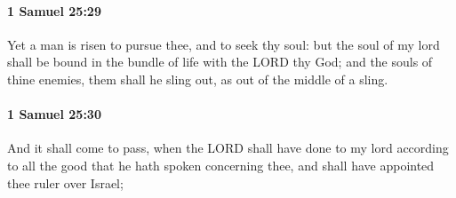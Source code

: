 		\paragraph{1 Samuel 25:29} %
			\label{1SAMUEL-25-29}

			Yet a man is risen to pursue thee, and to seek thy soul: but the soul of my lord shall be bound in the bundle of life with the LORD thy God; and the souls of thine enemies, them shall he sling out, as out of the middle of a sling.


		\paragraph{1 Samuel 25:30} %
			\label{1SAMUEL-25-30}

			And it shall come to pass, when the LORD shall have done to my lord according to all the good that he hath spoken concerning thee, and shall have appointed thee ruler over Israel;

